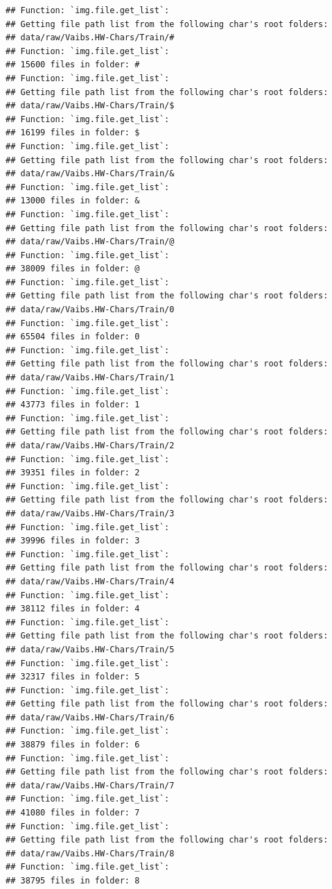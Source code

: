 \documentclass[
]{report}
\begin{document}
\begin{verbatim}
## Function: `img.file.get_list`:
## Getting file path list from the following char's root folders:
## data/raw/Vaibs.HW-Chars/Train/#
## Function: `img.file.get_list`:
## 15600 files in folder: #
## Function: `img.file.get_list`:
## Getting file path list from the following char's root folders:
## data/raw/Vaibs.HW-Chars/Train/$
## Function: `img.file.get_list`:
## 16199 files in folder: $
## Function: `img.file.get_list`:
## Getting file path list from the following char's root folders:
## data/raw/Vaibs.HW-Chars/Train/&
## Function: `img.file.get_list`:
## 13000 files in folder: &
## Function: `img.file.get_list`:
## Getting file path list from the following char's root folders:
## data/raw/Vaibs.HW-Chars/Train/@
## Function: `img.file.get_list`:
## 38009 files in folder: @
## Function: `img.file.get_list`:
## Getting file path list from the following char's root folders:
## data/raw/Vaibs.HW-Chars/Train/0
## Function: `img.file.get_list`:
## 65504 files in folder: 0
## Function: `img.file.get_list`:
## Getting file path list from the following char's root folders:
## data/raw/Vaibs.HW-Chars/Train/1
## Function: `img.file.get_list`:
## 43773 files in folder: 1
## Function: `img.file.get_list`:
## Getting file path list from the following char's root folders:
## data/raw/Vaibs.HW-Chars/Train/2
## Function: `img.file.get_list`:
## 39351 files in folder: 2
## Function: `img.file.get_list`:
## Getting file path list from the following char's root folders:
## data/raw/Vaibs.HW-Chars/Train/3
## Function: `img.file.get_list`:
## 39996 files in folder: 3
## Function: `img.file.get_list`:
## Getting file path list from the following char's root folders:
## data/raw/Vaibs.HW-Chars/Train/4
## Function: `img.file.get_list`:
## 38112 files in folder: 4
## Function: `img.file.get_list`:
## Getting file path list from the following char's root folders:
## data/raw/Vaibs.HW-Chars/Train/5
## Function: `img.file.get_list`:
## 32317 files in folder: 5
## Function: `img.file.get_list`:
## Getting file path list from the following char's root folders:
## data/raw/Vaibs.HW-Chars/Train/6
## Function: `img.file.get_list`:
## 38879 files in folder: 6
## Function: `img.file.get_list`:
## Getting file path list from the following char's root folders:
## data/raw/Vaibs.HW-Chars/Train/7
## Function: `img.file.get_list`:
## 41080 files in folder: 7
## Function: `img.file.get_list`:
## Getting file path list from the following char's root folders:
## data/raw/Vaibs.HW-Chars/Train/8
## Function: `img.file.get_list`:
## 38795 files in folder: 8

\end{verbatim}
\end{document}
